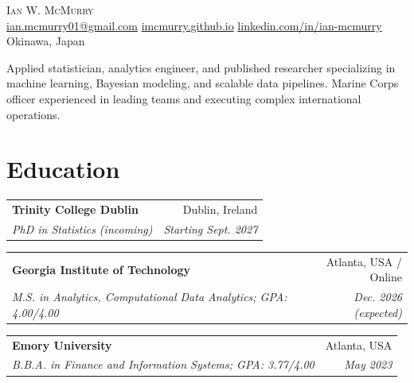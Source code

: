 \documentclass[letterpaper,11pt]{article}
\makeatletter
\newcommand{\entry}[4]{%
  \noindent\begin{tabularx}{\textwidth}{@{}Xr@{}}%
  \textbf{#1} & \small #2 \\
  \textit{\small #3} & \textit{\small #4} \\
  \end{tabularx}\vspace{1pt}\par}
\newcommand{\cvtext}[1]{{\small #1\par}}
\makeatother
\begin{document}
\begin{center}
    {\Huge\scshape Ian W. McMurry}\\[3pt]
    {\small\href{mailto:ian.mcmurry01@gmail.com}{ian.mcmurry01@gmail.com} \enspace\textbar\enspace
    \href{https://imcmurry.github.io/}{imcmurry.github.io} \enspace\textbar\enspace
    \href{https://www.linkedin.com/in/ian-mcmurry}{linkedin.com/in/ian-mcmurry} \enspace\textbar\enspace Okinawa, Japan}
\end{center}
\vspace{-5pt}
\cvtext{Applied statistician, analytics engineer, and published researcher specializing in machine learning, Bayesian modeling, and scalable data pipelines. Marine Corps officer experienced in leading teams and executing complex international operations.}

\section{Education}
\entry{Trinity College Dublin}{Dublin, Ireland}{PhD in Statistics (incoming)}{Starting Sept. 2027}
\entry{Georgia Institute of Technology}{Atlanta, USA / Online}{M.S. in Analytics, Computational Data Analytics; GPA: 4.00/4.00}{Dec. 2026 (expected)}
\entry{Emory University}{Atlanta, USA}{B.B.A. in Finance and Information Systems; GPA: 3.77/4.00}{May 2023}
\end{document}
